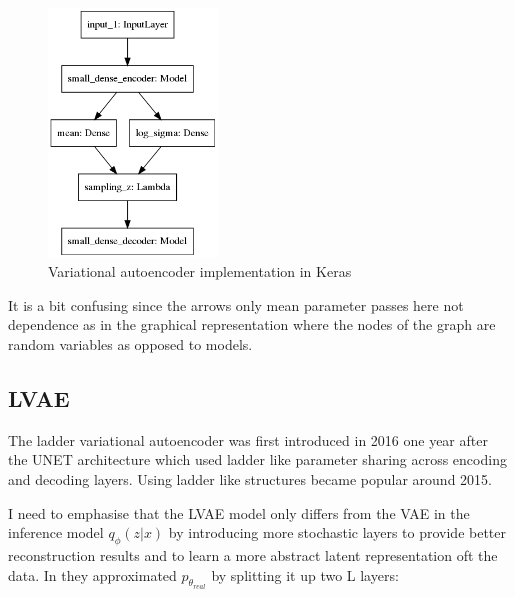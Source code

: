 \documentclass[11pt, english]{article}
\begin{document}
\vspace{3mm}

\begin{figure}[H]
    \centering
    \includegraphics[width=0.4\textwidth]{vae_keras.png}
    \caption{Variational autoencoder implementation in Keras}
\end{figure}

\vspace{3mm}

\par It is a bit confusing since the arrows only mean parameter passes here not dependence as in the graphical representation where the nodes of the graph are random variables as opposed to models. 

\subsection{LVAE}

\vspace{5mm}

\par The ladder variational autoencoder was first introduced in 2016 \cite{sonderby2016ladder} one year after the UNET \cite{ronneberger2015u} architecture which used ladder like parameter sharing across encoding and decoding layers. Using ladder like structures became popular around 2015.

\vspace{3mm}

\par I need to emphasise that the LVAE model only differs from the VAE in the inference model $q_{\phi} (z | x)$ by introducing more stochastic layers to provide better reconstruction results and to learn a more abstract latent representation oft the data. In \cite{sonderby2016ladder} they approximated $p_{\theta_{real}}$ by splitting it up two L layers:
\end{document}
